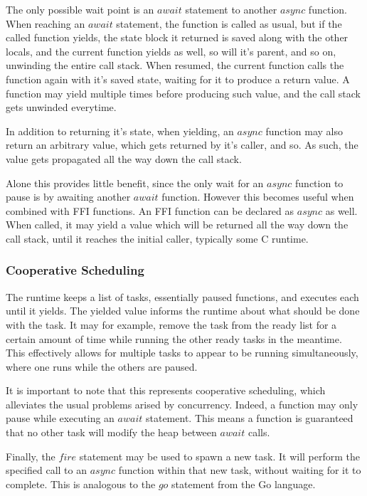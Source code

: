 \documentclass{article}
\begin{document}
The only possible wait point is an $await$ statement to another $async$ function. When reaching an $await$ statement,
the function is called as usual, but if the called function yields, the state block it returned is saved along with the
other locals, and the current function yields as well, so will it's parent, and so on, unwinding the entire call stack.
When resumed, the current function calls the function again with it's saved state, waiting for it to produce a return value.
A function may yield multiple times before producing such value, and the call stack gets unwinded everytime.

In addition to returning it's state, when yielding, an $async$ function may also return an arbitrary value, which gets
returned by it's caller, and so. As such, the value gets propagated all the way down the call stack.

Alone this provides little benefit, since the only wait for an $async$ function to pause is by awaiting another $await$
function. However this becomes useful when combined with FFI functions. An FFI function can be declared as $async$ as well.
When called, it may yield a value which will be returned all the way down the call stack, until it reaches the initial
caller, typically some C runtime.

\subsubsection{Cooperative Scheduling}
The runtime keeps a list of tasks, essentially paused functions, and executes each until it yields. The yielded value
informs the runtime about what should be done with the task. It may for example, remove the task from the ready list for
a certain amount of time while running the other ready tasks in the meantime. This effectively allows for multiple tasks to
appear to be running simultaneously, where one runs while the others are paused.

It is important to note that this represents cooperative scheduling, which alleviates the usual problems arised by
concurrency. Indeed, a function may only pause while executing an $await$ statement. This means a function is guaranteed
that no other task will modify the heap between $await$ calls.

Finally, the $fire$ statement may be used to spawn a new task. It will perform the specified call to an $async$ function
within that new task, without waiting for it to complete. This is analogous to the $go$ statement from the Go language.
\end{document}
